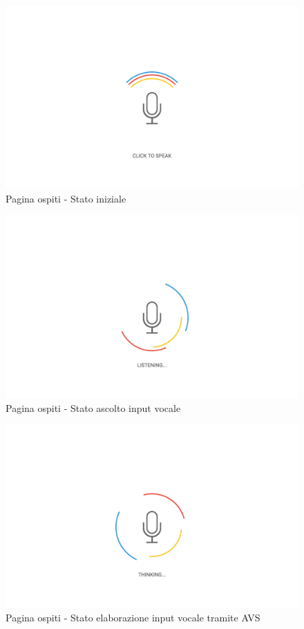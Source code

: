 \documentclass[../ManualeUtente_v2.0.0.tex]{subfiles}
\begin{document}
		\begin{figure}[!h]
			\centering
		 	\includegraphics[width=\textwidth]{Screenshot/guest-speak.png}
			\caption{Pagina ospiti - Stato iniziale}
			\label{fig:label}
		\end{figure}
		
		\begin{figure}[!h]
			\centering
		 	\includegraphics[width=\textwidth]{Screenshot/guest-listening.png}
			\caption{Pagina ospiti - Stato ascolto input vocale}
			\label{fig:label}
		\end{figure}
		
		\begin{figure}[!h]
			\centering
		 	\includegraphics[width=\textwidth]{Screenshot/guest-thinking.png}
			\caption{Pagina ospiti - Stato elaborazione input vocale tramite AVS}
			\label{fig:label}
		\end{figure}
\end{document}
